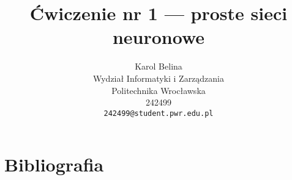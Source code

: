 \documentclass{article}
\title{Ćwiczenie nr 1 --- proste sieci neuronowe}
\author{
  Karol Belina\\
  Wydział Informatyki i Zarządzania\\
  Politechnika Wrocławska\\
  242499\\
  \texttt{242499@student.pwr.edu.pl}
}
\begin{document}
\maketitle

\begin{abstract}
  
\end{abstract}

\section*{Bibliografia}

\small
\end{document}
